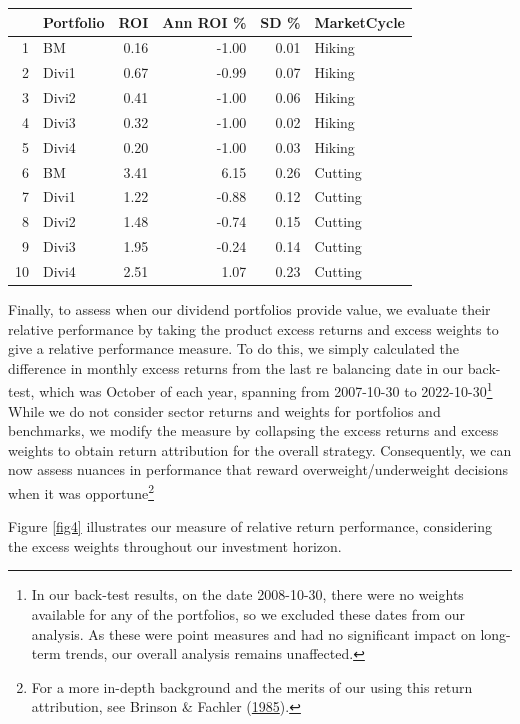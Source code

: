 \documentclass[11pt,preprint, authoryear]{elsarticle}
\let\origtable\table
\let\endorigtable\endtable
\renewenvironment{table}[1][2] {
    \expandafter\origtable\expandafter[H]
} {
    \endorigtable
}
\numberwithin{equation}{section}
\numberwithin{figure}{section}
\numberwithin{table}{section}
\let\rmarkdownfootnote\footnote%
\def\footnote{\protect\rmarkdownfootnote}
\begin{document}
\begin{table}[H]
\centering
\begin{tabular}{rlrrrl}
  \hline
 & Portfolio & ROI & Ann ROI \% & SD \% & MarketCycle \\ 
  \hline
1 & BM & 0.16 & -1.00 & 0.01 & Hiking \\ 
  2 & Divi1 & 0.67 & -0.99 & 0.07 & Hiking \\ 
  3 & Divi2 & 0.41 & -1.00 & 0.06 & Hiking \\ 
  4 & Divi3 & 0.32 & -1.00 & 0.02 & Hiking \\ 
  5 & Divi4 & 0.20 & -1.00 & 0.03 & Hiking \\ 
  6 & BM & 3.41 & 6.15 & 0.26 & Cutting \\ 
  7 & Divi1 & 1.22 & -0.88 & 0.12 & Cutting \\ 
  8 & Divi2 & 1.48 & -0.74 & 0.15 & Cutting \\ 
  9 & Divi3 & 1.95 & -0.24 & 0.14 & Cutting \\ 
  10 & Divi4 & 2.51 & 1.07 & 0.23 & Cutting \\ 
   \hline
\end{tabular}
\caption{Interest Rate Regime Performance \label{tab7}} 
\end{table}

Finally, to assess when our dividend portfolios provide value, we
evaluate their relative performance by taking the product excess returns
and excess weights to give a relative performance measure. To do this,
we simply calculated the difference in monthly excess returns from the
last re balancing date in our back-test, which was October of each year,
spanning from 2007-10-30 to 2022-10-30\footnote{In our back-test
  results, on the date 2008-10-30, there were no weights available for
  any of the portfolios, so we excluded these dates from our analysis.
  As these were point measures and had no significant impact on
  long-term trends, our overall analysis remains unaffected.} While we
do not consider sector returns and weights for portfolios and
benchmarks, we modify the measure by collapsing the excess returns and
excess weights to obtain return attribution for the overall strategy.
Consequently, we can now assess nuances in performance that reward
overweight/underweight decisions when it was opportune\footnote{For a
  more in-depth background and the merits of our using this return
  attribution, see Brinson \& Fachler
  (\protect\hyperlink{ref-brinson1985measuring}{1985}).}

Figure \ref{fig4} illustrates our measure of relative return
performance, considering the excess weights throughout our investment
horizon.
\end{document}
